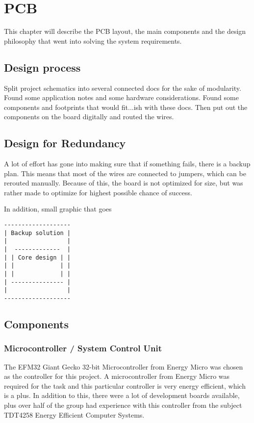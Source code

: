 \chapter{PCB}
\label{sec:pcb}

This chapter will describe the PCB layout, the main components and the design philosophy that went into solving the system requirements.

\section{Design process}
Split project schematics into several connected docs for the sake of modularity. Found some application notes and some hardware considerations. Found some components and footprints that would fit...ish with these docs. Then put out the components on the board digitally and routed the wires.


\section{Design for Redundancy}

A lot of effort has gone into making sure that if something fails, there is a backup plan.
This means that most of the wires are connected to jumpers, which can be rerouted manually.
Because of this, the board is not optimized for size, but was rather made to optimize for
highest possible chance of success.

In addition, small graphic that goes 
\begin{verbatim}
-------------------
| Backup solution |
|                 |
|  -------------  |
| | Core design | |
| |             | |
| |             | |
| --------------- |
|                 |
-------------------
 \end{verbatim}

\section{Components}

\subsection{Microcontroller / System Control Unit}
The EFM32 Giant Gecko 32-bit Microcontroller from Energy Micro was chosen as the controller for this project.
A microcontroller from Energy Micro was required for the task and this particular controller is
very energy efficient, which is a plus.
In addition to this, there were a lot of development boards available,
plus over half of the group had experience with this controller from the subject
TDT4258 Energy Efficient Computer Systems.

